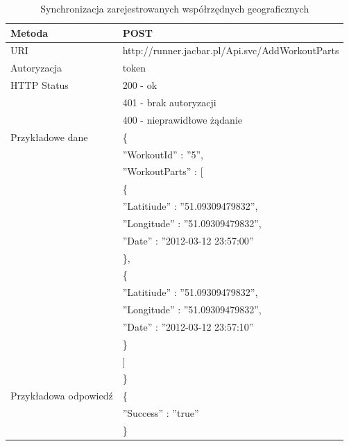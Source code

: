 \begin{table}
 \label{workoutpart}
  \caption{Synchronizacja zarejestrowanych współrzędnych geograficznych}
  \begin{center}
  \begin{tabular}{| l | l |}
  	\hline
  	Metoda & POST \\ \hline
  	URI & http://runner.jacbar.pl/Api.svc/AddWorkoutParts \\ \hline
  	Autoryzacja & token\\ \hline
  	HTTP Status & 200 - ok \\
                & 401 - brak autoryzacji \\
                & 400 - nieprawidłowe żądanie \\ \hline
    Przykładowe dane & \{ \\
    								 & \quad ''WorkoutId'' : ''5'', \\
    								 & \quad ''WorkoutParts'' : [ \\
    								 & \qquad \{ \\
    								 & \quad \qquad ''Latitiude'' : ''51.09309479832'', \\
    								 & \quad \qquad ''Longitude'' : ''51.09309479832'', \\
    								 & \quad \qquad ''Date'' : ''2012-03-12 23:57:00'' \\
    								 & \qquad \}, \\    								 & \qquad \{ \\
    								 & \quad \qquad ''Latitiude'' : ''51.09309479832'', \\
    								 & \quad \qquad ''Longitude'' : ''51.09309479832'', \\
    								 & \quad \qquad ''Date'' : ''2012-03-12 23:57:10'' \\
    								 & \qquad \} \\
    								 & \quad ] \\
    								 & \} \\ \hline
    Przykładowa odpowiedź & \{ \\
                          & \quad ''Success'' : ''true'' \\
                          & \} \\ \hline
  \end{tabular}
  \end{center}
\end{table}

